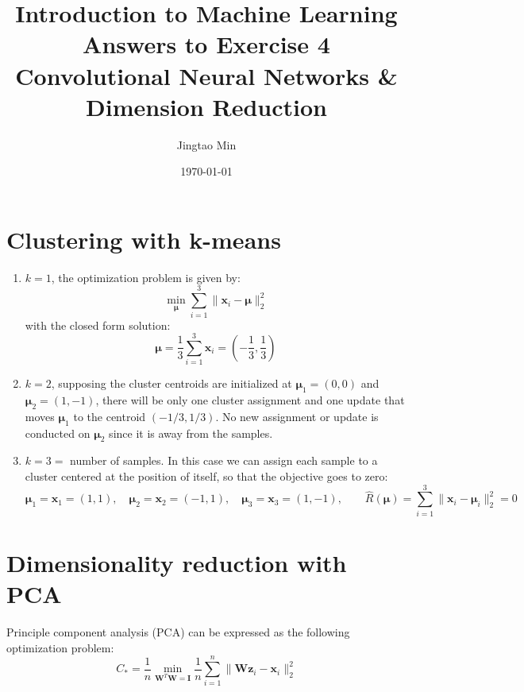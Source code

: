 \documentclass[a4paper, 10pt]{article}
\title{{\bfseries Introduction to Machine Learning} \\ Answers to Exercise 4 \\ Convolutional Neural Networks \& Dimension Reduction}
\author{Jingtao Min}
\date{\today}
\begin{document}
\maketitle

\section{Clustering with k-means}

\begin{enumerate}[label=(\alph*)]

    \item $k=1$, the optimization problem is given by:
    \begin{equation}
        \min_{\bm{\mu}} \sum_{i=1}^3 \|\mathbf{x}_i - \bm{\mu} \|_2^2
    \end{equation}
    with the closed form solution:
    \begin{equation}
        \bm{\mu} = \frac{1}{3}\sum_{i=1}^3 \mathbf{x}_i = \left(-\frac{1}{3}, \frac{1}{3}\right)
    \end{equation}

    \item $k=2$, supposing the cluster centroids are initialized at $\bm{\mu}_1 = (0, 0)$ and $\bm{\mu}_2 = (1, -1)$, there will be only one cluster assignment and one update that moves $\bm{\mu}_1$ to the centroid $(-1/3, 1/3)$. No new assignment or update is conducted on $\bm{\mu}_2$ since it is away from the samples.
    
    \item $k=3=$ number of samples. In this case we can assign each sample to a cluster centered at the position of itself, so that the objective goes to zero:
    \begin{equation}
        \bm{\mu}_1 = \mathbf{x}_1 = (1,1),\quad \bm{\mu}_2 = \mathbf{x}_2 = (-1,1), \quad \bm{\mu}_3 = \mathbf{x}_3 = (1,-1), \qquad \widehat{R}(\bm{\mu}) = \sum_{i=1}^3 \| \mathbf{x}_i - \bm{\mu}_i \|_2^2 = 0
    \end{equation}
    
\end{enumerate}


\section{Dimensionality reduction with PCA}

Principle component analysis (PCA) can be expressed as the following optimization problem:
\begin{equation}
    C_* = \frac{1}{n} \min_{\mathbf{W}^T \mathbf{W} = \mathbf{I}} \frac{1}{n} \sum_{i=1}^n \|\mathbf{W}\mathbf{z}_i - \mathbf{x}_i\|_2^2
\end{equation}
\end{document}

